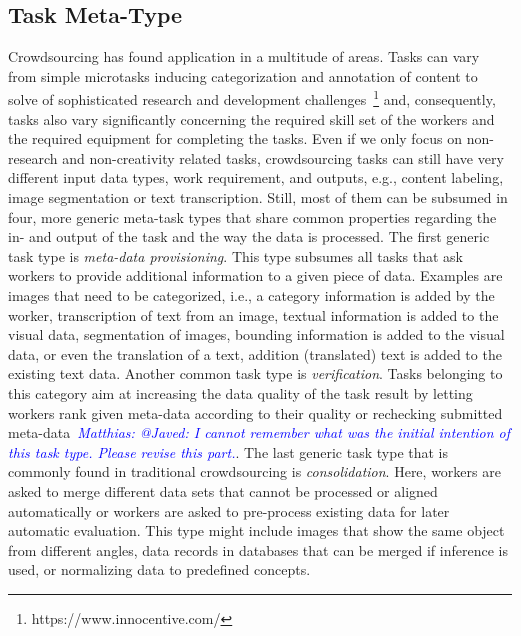 \documentclass[10pt,twocolumn,letterpaper]{article}
\newcommand{\matthias}[1]{\emph{\textcolor{blue}{Matthias: #1}}}
\begin{document}
\subsection{Task Meta-Type}
Crowdsourcing has found application in a multitude of areas.
Tasks can vary from simple microtasks inducing categorization and annotation of content to solve of sophisticated research and development challenges~\footnote{https://www.innocentive.com/} and, consequently, tasks also vary significantly concerning the required skill set of the workers and the required equipment for completing the tasks.
Even if we only focus on non-research and non-creativity related tasks, crowdsourcing tasks can still have very different input data types, work requirement, and outputs, e.g., content labeling, image segmentation or text transcription.
Still, most of them can be subsumed in four, more generic meta-task types that share common properties regarding the in- and output of the task and the way the data is processed.
The first generic task type is \emph{meta-data provisioning}.
This type subsumes all tasks that ask workers to provide additional information to a given piece of data.
Examples are images that need to be categorized, i.e., a category information is added by the worker, transcription of text from an image, textual information is added to the visual data, segmentation of images, bounding information is added to the visual data, or even the translation of a text, addition (translated) text is added to the existing text data.
Another common task type is \emph{verification}. 
Tasks belonging to this category aim at increasing the data quality of the task result by letting workers rank given meta-data according to their quality or rechecking submitted meta-data~\matthias{@Javed: I cannot remember what was the initial intention of this task type. Please revise this part.}.
The last generic task type that is commonly found in traditional crowdsourcing is \emph{consolidation}.
Here, workers are asked to merge different data sets that cannot be processed or aligned automatically or workers are asked to pre-process existing data for later automatic evaluation.
This type might include images that show the same object from different angles, data records in databases that can be merged if inference is used, or normalizing data to predefined concepts.
\end{document}
